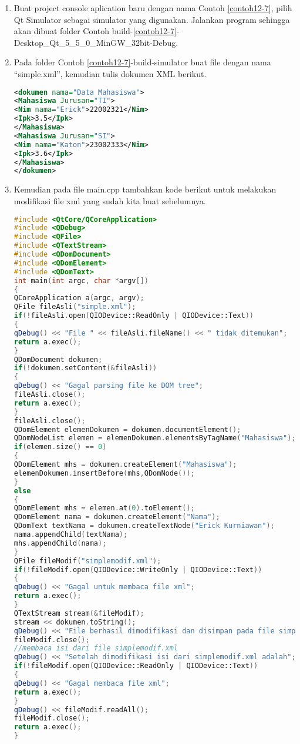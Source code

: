 \begin{enumerate}


\item
  Buat project console aplication baru dengan nama Contoh \ref{contoh12-7}, pilih Qt
  Simulator sebagai simulator yang digunakan. Jalankan program sehingga
  akan dibuat folder Contoh build-\ref{contoh12-7}-Desktop\_Qt\_5\_5\_0\_MinGW\_32bit-Debug.
\item
  Pada folder Contoh \ref{contoh12-7}-build-simulator buat file dengan nama
  ``simple.xml'', kemudian tulis dokumen XML berikut.

\begin{lstlisting}[language=xml]
<dokumen nama="Data Mahasiswa">
<Mahasiswa Jurusan="TI">
<Nim nama="Erick">22002321</Nim>
<Ipk>3.5</Ipk>
</Mahasiswa>
<Mahasiswa Jurusan="SI">
<Nim nama="Katon">23002333</Nim>
<Ipk>3.6</Ipk>
</Mahasiswa>
</dokumen>
\end{lstlisting}

\item
  Kemudian pada file main.cpp tambahkan kode berikut untuk melakukan
  modifikasi file xml yang sudah kita buat sebelumnya.

\begin{lstlisting}[language=c++, caption=Main program Modifikasi data dokumen XML, label=contoh12-7]
#include <QtCore/QCoreApplication>
#include <QDebug>
#include <QFile>
#include <QTextStream>
#include <QDomDocument>
#include <QDomElement>
#include <QDomText>
int main(int argc, char *argv[])
{
QCoreApplication a(argc, argv);
QFile fileAsli("simple.xml");
if(!fileAsli.open(QIODevice::ReadOnly | QIODevice::Text))
{
qDebug() << "File " << fileAsli.fileName() << " tidak ditemukan";
return a.exec();
}
QDomDocument dokumen;
if(!dokumen.setContent(&fileAsli))
{
qDebug() << "Gagal parsing file ke DOM tree";
fileAsli.close();
return a.exec();
}
fileAsli.close();
QDomElement elemenDokumen = dokumen.documentElement();
QDomNodeList elemen = elemenDokumen.elementsByTagName("Mahasiswa");
if(elemen.size() == 0)
{
QDomElement mhs = dokumen.createElement("Mahasiswa");
elemenDokumen.insertBefore(mhs,QDomNode());
}
else
{
QDomElement mhs = elemen.at(0).toElement();
QDomElement nama = dokumen.createElement("Nama");
QDomText textNama = dokumen.createTextNode("Erick Kurniawan");
nama.appendChild(textNama);
mhs.appendChild(nama);
}
QFile fileModif("simplemodif.xml");
if(!fileModif.open(QIODevice::WriteOnly | QIODevice::Text))
{
qDebug() << "Gagal untuk membaca file xml";
return a.exec();
}
QTextStream stream(&fileModif);
stream << dokumen.toString();
qDebug() << "File berhasil dimodifikasi dan disimpan pada file simplemodif.xml";
fileModif.close();
//membaca isi dari file simplemodif.xml
qDebug() << "Setelah dimodifikasi isi dari simplemodif.xml adalah";
if(!fileModif.open(QIODevice::ReadOnly | QIODevice::Text))
{
qDebug() << "Gagal membaca file xml";
return a.exec();
}
qDebug() << fileModif.readAll();
fileModif.close();
return a.exec();
}
\end{lstlisting}




\end{enumerate}
